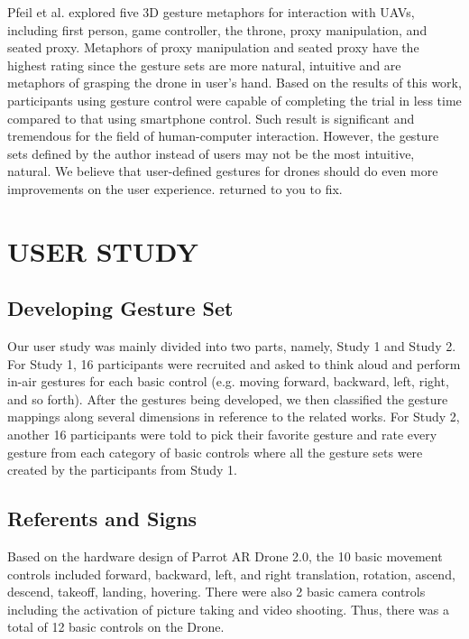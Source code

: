 \documentclass{sigchi}
\begin{document}
Pfeil et al. \cite{Pfeil:2013:EGM:2449396.2449429} explored five 3D gesture metaphors for interaction with UAVs, including first person, game controller, the throne, proxy manipulation, and seated proxy. Metaphors of proxy manipulation and seated proxy have the highest rating since the gesture sets are more natural, intuitive and are metaphors of grasping the drone in user's hand. Based on the results of this work, participants using gesture control were capable of completing the trial in less time compared to that using smartphone control. Such result is significant and tremendous for the field of human-computer interaction. However, the gesture sets defined by the author instead of users may not be the most intuitive, natural. We believe that user-defined gestures for drones should do even more improvements on the user experience.
returned to you to fix.

\section{USER STUDY}

\subsection{Developing Gesture Set}

Our user study was mainly divided into two parts, namely, Study 1 and Study 2. For Study 1, 16 participants were recruited and asked to think aloud and perform in-air gestures for each basic control (e.g. moving forward, backward, left, right, and so forth). After the gestures being developed, we then classified the gesture mappings along several dimensions in reference to the related works. For Study 2, another 16 participants were told to pick their favorite gesture and rate every gesture from each category of basic controls where all the gesture sets were created by the participants from Study 1.


\subsection{Referents and Signs}

Based on the hardware design of Parrot AR Drone 2.0, the 10 basic movement controls included forward, backward, left, and right translation, rotation, ascend, descend, takeoff, landing, hovering. There were also 2 basic camera controls including the activation of picture taking and video shooting. Thus, there was a total of 12 basic controls on the Drone.
\end{document}
